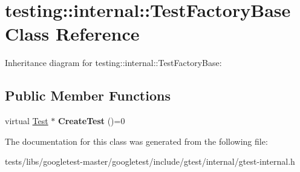 \hypertarget{classtesting_1_1internal_1_1TestFactoryBase}{}\section{testing\+:\+:internal\+:\+:Test\+Factory\+Base Class Reference}
\label{classtesting_1_1internal_1_1TestFactoryBase}


Inheritance diagram for testing\+:\+:internal\+:\+:Test\+Factory\+Base\+:
\subsection*{Public Member Functions}
\begin{DoxyCompactItemize}
\item 
\mbox{\label{classtesting_1_1internal_1_1TestFactoryBase_a07ac3ca0b196cdb092da0bb186b7c030}} 
virtual \hyperlink{classtesting_1_1Test}{Test} $\ast$ {\bfseries Create\+Test} ()=0
\end{DoxyCompactItemize}


The documentation for this class was generated from the following file\+:\begin{DoxyCompactItemize}
\item 
tests/libs/googletest-\/master/googletest/include/gtest/internal/gtest-\/internal.\+h\end{DoxyCompactItemize}
